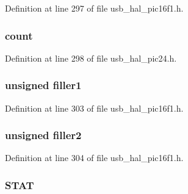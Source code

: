 Definition at line 297 of file usb\+\_\+hal\+\_\+pic16f1.\+h.

\hypertarget{union_____b_d_t_a25887517a6aa3f9cb2546327c8247a1e}{}
\subsubsection[{count}]{ count}\label{union_____b_d_t_a25887517a6aa3f9cb2546327c8247a1e}


Definition at line 298 of file usb\+\_\+hal\+\_\+pic24.\+h.

\hypertarget{union_____b_d_t_a41e639a5571e0a5239545b363f0284a0}{}
\subsubsection[{filler1}]{\setlength{\rightskip}{0pt plus 5cm}unsigned filler1}\label{union_____b_d_t_a41e639a5571e0a5239545b363f0284a0}


Definition at line 303 of file usb\+\_\+hal\+\_\+pic16f1.\+h.

\hypertarget{union_____b_d_t_af0da7963e5d18db6d00c9605bdd265c9}{}
\subsubsection[{filler2}]{\setlength{\rightskip}{0pt plus 5cm}unsigned filler2}\label{union_____b_d_t_af0da7963e5d18db6d00c9605bdd265c9}


Definition at line 304 of file usb\+\_\+hal\+\_\+pic16f1.\+h.

\hypertarget{union_____b_d_t_ac3cab1502caf8390e8ec18cba01f2f09}{}
\subsubsection[{S\+T\+A\+T}]{ S\+T\+A\+T}\label{union_____b_d_t_ac3cab1502caf8390e8ec18cba01f2f09}


